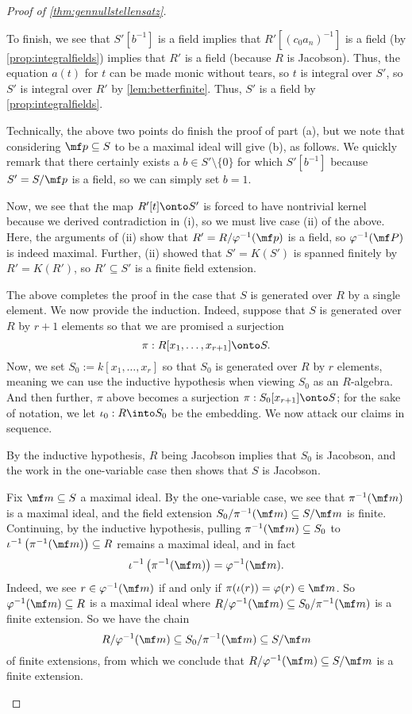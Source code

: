 \documentclass[../notes.tex]{subfiles}
\begin{document}
\begin{proof}[Proof of \autoref{thm:gennullstellensatz}]
\begin{enumerate}[label=(\roman*)]
		To finish, we see that $S'\left[b^{-1}\right]$ is a field implies that $R'\left[(c_0a_n)^{-1}\right]$ is a field (by \autoref{prop:integralfields}) implies that $R'$ is a field (because $R$ is Jacobson). Thus, the equation $a(t)$ for $t$ can be made monic without tears, so $t$ is integral over $S'$, so $S'$ is integral over $R'$ by \autoref{lem:betterfinite}. Thus, $S'$ is a field by \autoref{prop:integralfields}.
	\end{enumerate}
	Technically, the above two points do finish the proof of part (a), but we note that considering $\mf p\subseteq S$ to be a maximal ideal will give (b), as follows. We quickly remark that there certainly exists a $b\in S'\setminus\{0\}$ for which $S'\left[b^{-1}\right]$ because $S'=S/\mf p$ is a field, so we can simply set $b=1$.
	
	Now, we see that the map $R'[t]\onto S'$ is forced to have nontrivial kernel because we derived contradiction in (i), so we must live case (ii) of the above. Here, the arguments of (ii) show that $R'=R/\varphi^{-1}(\mf p)$ is a field, so $\varphi^{-1}(\mf P)$ is indeed maximal. Further, (ii) showed that $S'=K(S')$ is spanned finitely by $R'=K(R')$, so $R'\subseteq S'$ is a finite field extension.

	The above completes the proof in the case that $S$ is generated over $R$ by a single element. We now provide the induction. Indeed, suppose that $S$ is generated over $R$ by $r+1$ elements so that we are promised a surjection
	\[\pi:R[x_1,\ldots,x_{r+1}]\onto S.\]
	Now, we set $S_0:=k[x_1,\ldots,x_r]$ so that $S_0$ is generated over $R$ by $r$ elements, meaning we can use the inductive hypothesis when viewing $S_0$ as an $R$-algebra. And then further, $\pi$ above becomes a surjection $\pi:S_0[x_{r+1}]\onto S$; for the sake of notation, we let $\iota_0:R\into S_0$ be the embedding. We now attack our claims in sequence.
	\begin{listalph}
		\item By the inductive hypothesis, $R$ being Jacobson implies that $S_0$ is Jacobson, and the work in the one-variable case then shows that $S$ is Jacobson.
		\item Fix $\mf m\subseteq S$ a maximal ideal. By the one-variable case, we see that $\pi^{-1}(\mf m)$ is a maximal ideal, and the field extension $S_0/\pi^{-1}(\mf m)\subseteq S/\mf m$ is finite. Continuing, by the inductive hypothesis, pulling $\pi^{-1}(\mf m)\subseteq S_0$ to $\iota^{-1}\left(\pi^{-1}(\mf m)\right)\subseteq R$ remains a maximal ideal, and in fact
		\[\iota^{-1}\left(\pi^{-1}(\mf m)\right)=\varphi^{-1}(\mf m).\]
		Indeed, we see $r\in\varphi^{-1}(\mf m)$ if and only if $\pi(\iota(r))=\varphi(r)\in\mf m$. So $\varphi^{-1}(\mf m)\subseteq R$ is a maximal ideal where $R/\varphi^{-1}(\mf m)\subseteq S_0/\pi^{-1}(\mf m)$ is a finite extension. So we have the chain
		\[R/\varphi^{-1}(\mf m)\subseteq S_0/\pi^{-1}(\mf m)\subseteq S/\mf m\]
		of finite extensions, from which we conclude that $R/\varphi^{-1}(\mf m)\subseteq S/\mf m$ is a finite extension.
		\qedhere
	\end{listalph}
\end{proof}
\end{document}
